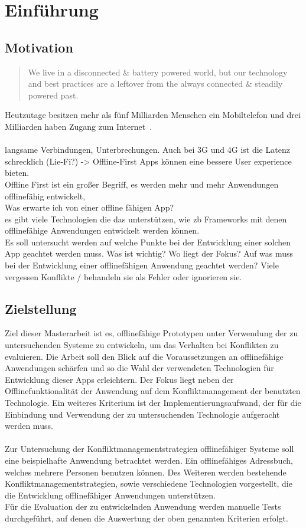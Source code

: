 \chapter{\label{chap:einleitung}Einführung}
\section{Motivation}
\begin{quote}
	We live in a disconnected \& battery powered world, but our technology and best practices are a leftover from the always connected \& steadily powered past.
	\cite{offlinefirst}
\end{quote}

Heutzutage besitzen mehr als fünf Milliarden Menschen ein Mobiltelefon und drei Milliarden haben Zugang zum Internet~\cite{dev-report}.\\\\
langsame Verbindungen, Unterbrechungen. Auch bei 3G und 4G ist die Latenz schrecklich (Lie-Fi?) -> Offline-First Apps können eine bessere User experience bieten.\\
Offline First ist ein großer Begriff, es werden mehr und mehr Anwendungen offlinefähig entwickelt,\\
Was erwarte ich von einer offline fähigen App?\\
es gibt viele Technologien die das unterstützen, wie zb Frameworks mit denen offlinefähige Anwendungen entwickelt werden können.\\
Es soll untersucht werden auf welche Punkte bei der Entwicklung einer solchen App geachtet werden muss.
Was ist wichtig? Wo liegt der Fokus? 
Auf was muss bei der Entwicklung einer offlinefähigen Anwendung geachtet werden?
Viele vergessen Konflikte / behandeln sie als Fehler oder ignorieren sie.
\\
%
%
\section{Zielstellung}
Ziel dieser Masterarbeit ist es, offlinefähige Prototypen unter Verwendung der zu untersuchenden Systeme zu entwickeln, um das Verhalten bei Konflikten zu evaluieren.
Die Arbeit soll den Blick auf die Voraussetzungen an offlinefähige Anwendungen schärfen und so die Wahl der verwendeten Technologien für Entwicklung dieser \glspl{App} erleichtern.
Der Fokus liegt neben der Offlinefunktionalität der Anwendung auf dem Konfliktmanagement der benutzten Technologie.
Ein weiteres Kriterium ist der Implementierungsaufwand, der für die Einbindung und Verwendung der zu untersuchenden Technologie aufgeracht werden muss.\\\\
%
Zur Untersuchung der Konfliktmanagementstrategien offlinefähiger Systeme soll eine beispielhafte Anwendung betrachtet werden. Ein offlinefähiges Adressbuch, welches mehrere Personen benutzen können.
Des Weiteren werden bestehende Konfliktmanagementstrategien, sowie verschiedene Technologien vorgestellt, die die Entwicklung offlinefähiger Anwendungen unterstützen.\\
Für die Evaluation der zu entwickelnden Anwendung werden manuelle Tests durchgeführt, auf denen die Auswertung der oben genannten Kriterien erfolgt.
